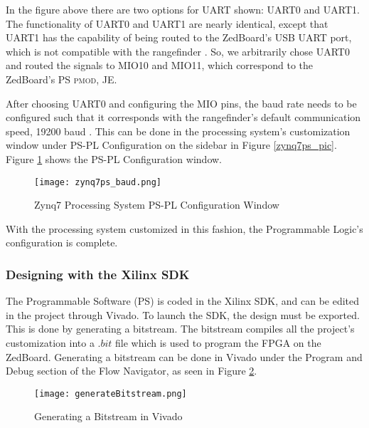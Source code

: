 In the figure above there are two options for UART shown: UART0 and UART1. The functionality of UART0 and UART1 are nearly identical, except that UART1 has the capability of being routed to the ZedBoard's USB UART port, which is not compatible with the rangefinder \cite{zedboard_datasheet}. So, we arbitrarily chose UART0 and routed the signals to MIO10 and MIO11, which correspond to the ZedBoard's PS \textsc{pmod}, JE.
\par
After choosing UART0 and configuring the MIO pins, the baud rate needs to be configured such that it corresponds with the rangefinder's default communication speed, 19200 baud \cite{urg04lx_datasheet}. This can be done in the processing system's customization window under PS-PL Configuration on the sidebar in Figure \ref{zynq7ps_pic}. Figure \ref{zynq7ps_baud_pic} shows the PS-PL Configuration window.

\begin{figure}[H]
	\centerline{\texttt{[image: zynq7ps\_baud.png]}}
	\caption{Zynq7 Processing System PS-PL Configuration Window}
	\label{zynq7ps_baud_pic}
\end{figure}

With the processing system customized in this fashion, the Programmable Logic's configuration is complete.

\subsubsection{Designing with the Xilinx SDK}
The Programmable Software (PS) is coded in the Xilinx SDK, and can be edited in the project through Vivado. To launch the SDK, the design must be exported. This is done by generating a bitstream. The bitstream compiles all the project's customization into a $.bit$ file which is used to program the FPGA on the ZedBoard. Generating a bitstream can be done in Vivado under the Program and Debug section of the Flow Navigator, as seen in Figure \ref{generateBitstream}.

\begin{figure}[H]
	\centerline{\texttt{[image: generateBitstream.png]}}
	\caption{Generating a Bitstream in Vivado}
	\label{generateBitstream}
\end{figure}

